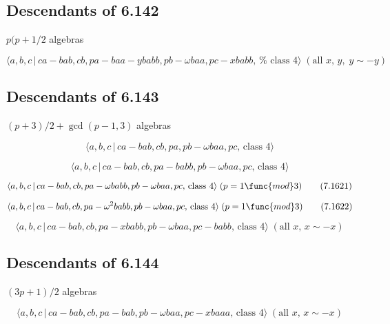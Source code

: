 \documentclass[10pt]{article}
\begin{document}
\subsection{Descendants of 6.142}

$p(p+1/2$ algebras

\begin{equation}
\langle a,b,c\,|\,ca-bab,cb,pa-baa-ybabb,pb-\omega baa,pc-xbabb,\,\text{%
class }4\rangle \;(\text{all }x,\,y,\;y\sim -y)  \tag{7.1618}
\end{equation}

\subsection{Descendants of 6.143}

$(p+3)/2+\gcd (p-1,3)$ algebras

\begin{equation}
\langle a,b,c\,|\,ca-bab,cb,pa,pb-\omega baa,pc,\,\text{class }4\rangle 
\tag{7.1619}
\end{equation}

\begin{equation}
\langle a,b,c\,|\,ca-bab,cb,pa-babb,pb-\omega baa,pc,\,\text{class }4\rangle
\tag{7.1620}
\end{equation}

\begin{equation}
\langle a,b,c\,|\,ca-bab,cb,pa-\omega babb,pb-\omega baa,pc,\,\text{class }%
4\rangle \;(p=1\func{mod}3)  \tag{7.1621}
\end{equation}

\begin{equation}
\langle a,b,c\,|\,ca-bab,cb,pa-\omega ^{2}babb,pb-\omega baa,pc,\,\text{%
class }4\rangle \;(p=1\func{mod}3)  \tag{7.1622}
\end{equation}

\begin{equation}
\langle a,b,c\,|\,ca-bab,cb,pa-xbabb,pb-\omega baa,pc-babb,\,\text{class }%
4\rangle \;(\text{all }x,\,x\sim -x)  \tag{7.1623}
\end{equation}

\subsection{Descendants of 6.144}

$(3p+1)/2$ algebras

\begin{equation}
\langle a,b,c\,|\,ca-bab,cb,pa-bab,pb-\omega baa,pc-xbaaa,\,\text{class }%
4\rangle \;(\text{all }x,\,x\sim -x)  \tag{7.1624}
\end{equation}
\end{document}
